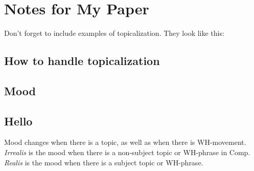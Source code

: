 \documentclass[14pt]{article}
\begin{document}
    \section*{Notes for My Paper}

    Don't forget to include examples of topicalization.
    They look like this:

    \subsection*{How to handle topicalization}

    \subsection*{Mood}

\subsection*{Hello}

Mood changes when there is a topic, as well as when
there is WH-movement.  \emph{Irrealis} is the mood when
there is a non-subject topic or WH-phrase in Comp.
\emph{Realis} is the mood when there is a subject topic
or WH-phrase.
\end{document}
